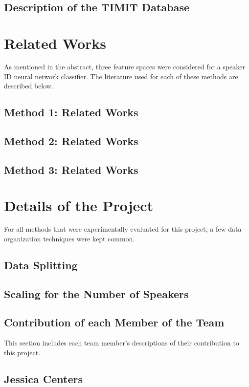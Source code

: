 \documentclass{article}
\begin{document}
\subsection{Description of the TIMIT Database}

\section{Related Works}
As mentioned in the abstract, three feature spaces were considered for a speaker ID neural network classifier. The literature used for each of these methods are described below.
\subsection{Method 1: Related Works}

\subsection{Method 2: Related Works}

\subsection{Method 3: Related Works}

\section{Details of the Project}
For all methods that were experimentally evaluated for this project, a few data organization techniques were kept common. 
\subsection{Data Splitting}

\subsection{Scaling for the Number of Speakers}

\subsection{Contribution of each Member of the Team}
This section includes each team member's descriptions of their contribution to this project.
\subsection{Jessica Centers}
\end{document}
